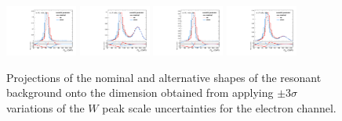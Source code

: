 \begin{figure}[htbp]
  \centering
  \includegraphics[width=0.21\textwidth]{fig/analysisAppendix/systs_res_e_HP_nobb_LDy_scaleWY_ProjY.pdf}
  \includegraphics[width=0.21\textwidth]{fig/analysisAppendix/systs_res_e_LP_nobb_LDy_scaleWY_ProjY.pdf}
  \includegraphics[width=0.21\textwidth]{fig/analysisAppendix/systs_res_e_HP_nobb_HDy_scaleWY_ProjY.pdf}
  \includegraphics[width=0.21\textwidth]{fig/analysisAppendix/systs_res_e_LP_nobb_HDy_scaleWY_ProjY.pdf}\\
  \caption{
    Projections of the nominal and alternative shapes of the resonant background onto the \MJ dimension obtained from applying $\pm3\sigma$ variations of the $W$ peak scale uncertainties for the electron channel.
  }
  \label{fig:systResMJ_scaleWY}
\end{figure}

